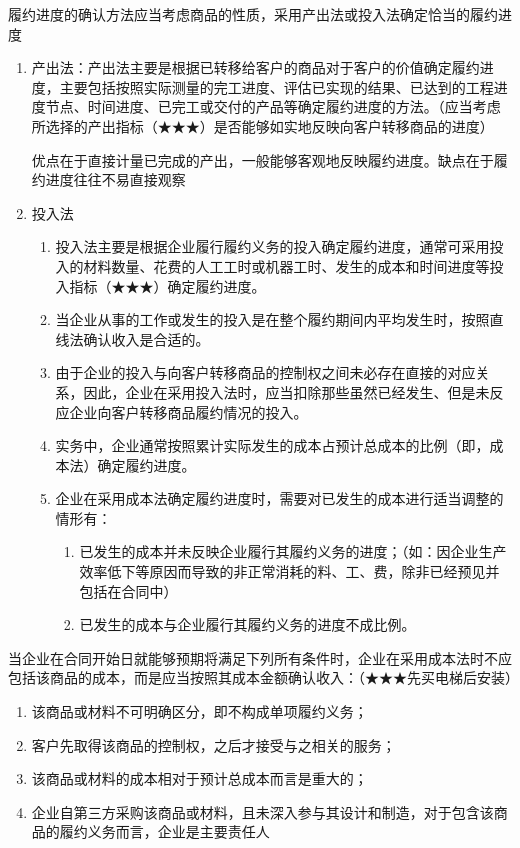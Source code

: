 \documentclass[UTF8,12pt]{ctexart}
\numberwithin{equation}{section} %
\numberwithin{figure}{section}
\numberwithin{table}{section}
\begin{document}
	履约进度的确认方法应当考虑商品的性质，采用产出法或投入法确定恰当的履约进度
	\begin{enumerate}
		\item 产出法：产出法主要是根据已转移给客户的商品对于客户的价值确定履约进度，主要包括按照实际测量的完工进度、评估已实现的结果、已达到的工程进度节点、时间进度、已完工或交付的产品等确定履约进度的方法。（应当考虑所选择的产出指标（★★★）是否能够如实地反映向客户转移商品的进度）
		
		优点在于直接计量已完成的产出，一般能够客观地反映履约进度。缺点在于履约进度往往不易直接观察
		
		\item 投入法
		\begin{enumerate}
			\item 投入法主要是根据企业履行履约义务的投入确定履约进度，通常可采用投入的材料数量、花费的人工工时或机器工时、发生的成本和时间进度等投入指标（★★★）确定履约进度。
			
			\item 当企业从事的工作或发生的投入是在整个履约期间内平均发生时，按照直线法确认收入是合适的。
			
			\item 由于企业的投入与向客户转移商品的控制权之间未必存在直接的对应关系，因此，企业在采用投入法时，应当扣除那些虽然已经发生、但是未反应企业向客户转移商品履约情况的投入。
			
			\item 实务中，企业通常按照累计实际发生的成本占预计总成本的比例（即，成本法）确定履约进度。
			
			\item 企业在采用成本法确定履约进度时，需要对已发生的成本进行适当调整的情形有：
			\begin{enumerate}
				\item 已发生的成本并未反映企业履行其履约义务的进度；（如：因企业生产效率低下等原因而导致的非正常消耗的料、工、费，除非已经预见并包括在合同中）
				
				\item 已发生的成本与企业履行其履约义务的进度不成比例。
			\end{enumerate}
		\end{enumerate}
	\end{enumerate}

	当企业在合同开始日就能够预期将满足下列所有条件时，企业在采用成本法时不应包括该商品的成本，而是应当按照其成本金额确认收入：（★★★先买电梯后安装）
	\begin{enumerate}
		\item 该商品或材料不可明确区分，即不构成单项履约义务；
		
		\item 客户先取得该商品的控制权，之后才接受与之相关的服务；
		
		\item 该商品或材料的成本相对于预计总成本而言是重大的；
		
		\item 企业自第三方采购该商品或材料，且未深入参与其设计和制造，对于包含该商品的履约义务而言，企业是主要责任人
	\end{enumerate}
\end{document}
